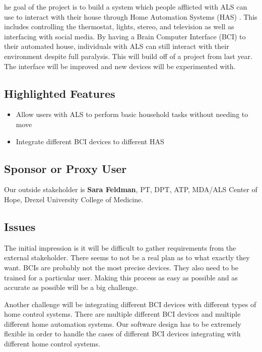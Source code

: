 \documentclass{report}
\begin{document}

he goal of the project is to build a system which people afflicted with ALS can use to interact with their house through Home Automation Systems (HAS) . This includes controlling the thermostat, lights, stereo, and television as well as interfacing with social media. By having a Brain Computer Interface (BCI) to their automated house, individuals with ALS can still interact with their environment despite full paralysis. This will build off of a project from last year. The interface will be improved and new devices will be experimented with.  

\subsection*{Highlighted Features}

\begin{itemize}
\item Allow users with ALS to perform basic household tasks without needing to move
\item Integrate different BCI devices to different HAS
\end{itemize}

\subsection*{Sponsor or Proxy User}

Our outside stakeholder is \textbf{Sara Feldman}, PT, DPT, ATP, MDA/ALS Center
of Hope, Drexel University College of Medicine.


\subsection*{Issues}

The initial impression is it will be difficult to gather requirements from the external stakeholder. There seems to not be a real plan as to what exactly they want. 
BCIs are probably not the most precise devices. They also need to be trained for a particular user. Making this process as easy as possible and as accurate as possible will be a big challenge.

Another challenge will be integrating different BCI devices with different types of home control systems. There are multiple different BCI devices and multiple different home automation systems. Our software design has to be extremely flexible in order to handle the cases of different BCI devices integrating with different home control systems. 
\end{document}
